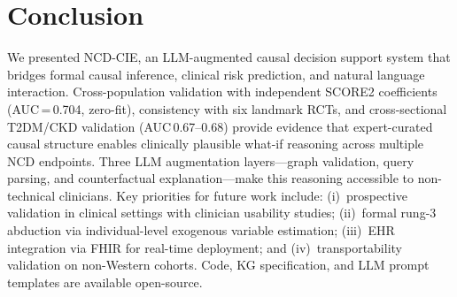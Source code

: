 \documentclass[runningheads]{llncs}
\begin{document}
\section{Conclusion}\label{sec:conclusion}

We presented NCD-CIE, an LLM-augmented causal decision support
system that bridges formal causal inference, clinical risk
prediction, and natural language interaction.
Cross-population validation with independent SCORE2 coefficients
(AUC\,=\,0.704, zero-fit), consistency with six landmark RCTs,
and cross-sectional T2DM/CKD validation (AUC\,0.67--0.68)
provide evidence that expert-curated causal structure enables
clinically plausible what-if reasoning across multiple NCD
endpoints.
Three LLM augmentation layers---graph validation, query parsing,
and counterfactual explanation---make this reasoning accessible
to non-technical clinicians.
Key priorities for future work include: (i)~prospective validation
in clinical settings with clinician usability studies;
(ii)~formal rung-3 abduction via individual-level exogenous
variable estimation; (iii)~EHR integration via FHIR for
real-time deployment; and (iv)~transportability validation on
non-Western cohorts.
Code, KG specification, and LLM prompt templates are available
open-source.
\end{document}
